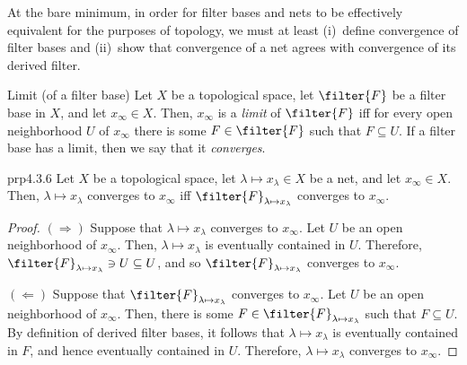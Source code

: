 At the bare minimum, in order for filter bases and nets to be effectively equivalent for the purposes of topology, we must at least (i)~define convergence of filter bases and (ii)~show that convergence of a net agrees with convergence of its derived filter.
\begin{dfn}{Limit (of a filter base)}{}
Let $X$ be a topological space, let $\filter{F}$ be a filter base in $X$, and let $x_\infty \in X$.  Then, $x_\infty$ is a \emph{limit} of $\filter{F}$ iff for every open neighborhood $U$ of $x_\infty$ there is some $F\in \filter{F}$ such that $F\subseteq U$.  If a filter base has a limit, then we say that it \emph{converges}.
\end{dfn}
\begin{prp}{}{prp4.3.6}
Let $X$ be a topological space, let $\lambda \mapsto x_\lambda \in X$ be a net, and let $x_\infty \in X$.  Then, $\lambda \mapsto x_\lambda$ converges to $x_\infty$ iff $\filter{F}_{\lambda \mapsto x_\lambda}$ converges to $x_\infty$.
\begin{proof}
$(\Rightarrow )$ Suppose that $\lambda \mapsto x_\lambda$ converges to $x_\infty$.  Let $U$ be an open neighborhood of $x_\infty$.  Then, $\lambda \mapsto x_\lambda$ is eventually contained in $U$.  Therefore, $\filter{F}_{\lambda \mapsto x_{\lambda}}\ni U\subseteq U$, and so $\filter{F}_{\lambda \mapsto x_\lambda}$ converges to $x_\infty$.

\blankline
\noindent
$(\Leftarrow )$ Suppose that $\filter{F}_{\lambda \mapsto x_\lambda}$ converges to $x_\infty$.  Let $U$ be an open neighborhood of $x_\infty$.  Then, there is some $F\in \filter{F}_{\lambda \mapsto x_\lambda}$ such that $F\subseteq U$.  By definition of derived filter bases, it follows that $\lambda \mapsto x_\lambda$ is eventually contained in $F$, and hence eventually contained in $U$.  Therefore, $\lambda \mapsto x_\lambda$ converges to $x_\infty$.
\end{proof}
\end{prp}

